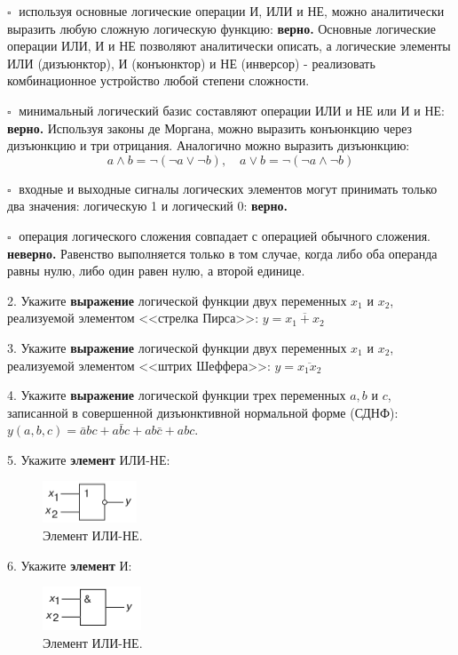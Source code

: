 \documentclass[spec, och, otchet, hidelinks]{SCWorks}
\begin{document}
\par $ \square \; $ используя основные логические операции И, ИЛИ и НЕ, можно аналитически
выразить любую сложную логическую функцию: \textbf{верно.} Основные логические операции ИЛИ, И и НЕ 
позволяют аналитически описать, а логические элементы ИЛИ (дизъюнктор), И (конъюнктор) и НЕ (инверсор) - 
реализовать комбинационное устройство любой степени сложности.

\par $ \square \; $ минимальный логический базис составляют операции ИЛИ и НЕ или И и НЕ: \textbf{верно.}
Используя законы де Моргана, можно выразить конъюнкцию через дизъюнкцию и три отрицания. 
Аналогично можно выразить дизъюнкцию: $$ a \wedge b = \neg(\neg a \vee \neg b), \quad 
a \vee b = \neg(\neg a \wedge \neg b) $$

\par $ \square \; $ входные и выходные сигналы логических элементов могут принимать только
два значения: логическую 1 и логический 0: \textbf{верно.}
\par $ \square \; $ операция логического сложения совпадает с операцией обычного сложения. \textbf{неверно.}
Равенство выполняется только в том случае, когда либо оба операнда равны нулю, либо один равен нулю, 
а второй единице.

2. Укажите \textbf{выражение} логической функции двух переменных $ x_1 $ и $ x_2 $, реализуемой элементом
<<стрелка Пирса>>: $ y = \overline{x_1 + x_2} $

3. Укажите \textbf{выражение} логической функции двух переменных $ x_1 $ и $ x_2 $, реализуемой элементом
<<штрих Шеффера>>: $ y = \overline{x_1 x_2} $

4. Укажите \textbf{выражение} логической функции трех переменных $ a, b $ и $ c $, записанной в совершенной
дизъюнктивной нормальной форме (СДНФ): $ y(a, b, c) = \bar a bc + a \bar b c + ab \bar c + abc $.

5. Укажите \textbf{элемент} ИЛИ-НЕ:

\begin{figure}[h]
	\center\includegraphics{nor.png}
	\caption{Элемент ИЛИ-НЕ.}
\end{figure}

6. Укажите \textbf{элемент} И:

\begin{figure}[h]
	\center\includegraphics{and.png}
	\caption{Элемент ИЛИ-НЕ.}
\end{figure}
\end{document}
